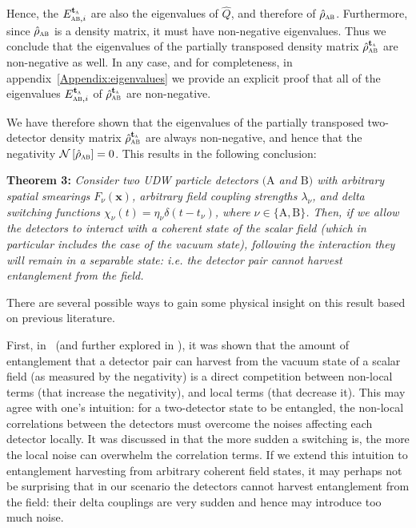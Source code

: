 \documentclass[pra,nofootinbib,floats,aps,twocolumn,tightenlines,superscriptaddress]{revtex4-1}
\newcommand{\rhoab}{\hat{\rho}_\textsc{ab}}
\newcommand{\rhoabpt}{\hat{\rho}_\textsc{ab}^{{\text{\textbf{t}}}_\textsc{a}}}
\begin{document}
Hence, the $E_{\textsc{ab},i}^{{\text{\textbf{t}}}_\textsc{a}}$ are also the eigenvalues of $\hat{Q}$, and therefore of $\rhoab$. Furthermore, since $\rhoab$ is a density matrix, it must have non-negative eigenvalues. Thus we conclude that the eigenvalues of the partially transposed density matrix $\rhoabpt$ are non-negative as well. In any case, and for completeness, in appendix~\ref{Appendix:eigenvalues} we provide an explicit proof that all of the eigenvalues $E_{\textsc{ab},i}^{{\text{\textbf{t}}}_\textsc{a}}$ of $\rhoabpt$ are non-negative.

We have therefore shown that the eigenvalues of the partially transposed two-detector density matrix $\rhoabpt$ are always non-negative, and hence that the negativity $\mathcal{N}\left[\rhoab\right]=0$. This results in the following conclusion:

\vspace{2mm}
\textbf{Theorem 3:} \textit{Consider two UDW particle detectors $\mathrm{(A}$ and $\mathrm{B)}$ with arbitrary spatial smearings $F_\nu(\bm x)$, arbitrary field coupling strengths $\lambda_\nu$, and delta switching functions \mbox{$\chi_\nu(t)=\eta_\nu\delta(t-t_\nu)$}, where $\nu\in\{\mathrm{A},\mathrm{B} \}$. Then, if we allow the detectors to interact with a coherent state of the scalar field (which in particular includes the case of the vacuum state), following the interaction they will remain in a separable state: i.e. the detector pair cannot harvest entanglement from the field.}
\vspace{2mm}

There are several possible ways to gain some physical insight on this result based on previous literature.

First, in~\cite{Reznik2005} (and further explored in \cite{Pozas2015}), it was shown that the amount of entanglement that a detector pair can harvest from the vacuum state of a scalar field (as measured by the negativity) is a direct competition between non-local terms (that increase the negativity), and local terms (that decrease it). This may agree with one's intuition: for a two-detector state to be entangled, the non-local correlations between the detectors must overcome the noises affecting each detector locally. It was discussed in \cite{Pozas2015} that the more sudden a switching is, the more the local noise can overwhelm the correlation terms. If we extend this intuition to entanglement harvesting from arbitrary coherent field states, it may perhaps not be surprising that in our scenario the detectors cannot harvest entanglement from the field: their delta couplings are very sudden and hence may introduce too much noise.
\end{document}
